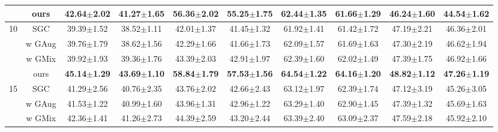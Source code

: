 \begin{table*}[ht]
{\begin{tabular}{@{}c|c|cccccccc@{}}
                      & ours                   & \textbf{42.64$\pm$2.02}          & \textbf{41.27$\pm$1.65}         & \textbf{56.36$\pm$2.02}          & \textbf{55.25$\pm$1.75}         & \textbf{62.44$\pm$1.35}         & \textbf{61.66$\pm$1.29}         & \textbf{46.24$\pm$1.60}         & \textbf{44.54$\pm$1.62}         \\ \midrule
\multirow{4}{*}{10}   & SGC                    & 39.39$\pm$1.52                   & 38.52$\pm$1.11                  & 42.01$\pm$1.37                   & 41.45$\pm$1.32                  & 61.92$\pm$1.41                  & 61.42$\pm$1.72                  & 47.19$\pm$2.21                  & 46.36$\pm$2.01                  \\
                      & w GAug                 & 39.76$\pm$1.79                   & 38.62$\pm$1.56                  & 42.29$\pm$1.66                   & 41.66$\pm$1.73                  & 62.09$\pm$1.57                  & 61.69$\pm$1.63                  & 47.30$\pm$2.19                  & 46.62$\pm$1.94                  \\
                      & w GMix                 & 39.92$\pm$1.93                   & 39.36$\pm$1.76                  & 43.39$\pm$2.03                   & 42.91$\pm$1.97                  & 62.39$\pm$1.60                  & 62.02$\pm$1.49                  & 47.39$\pm$1.75                  & 46.92$\pm$1.66                  \\
                      & ours                   & \textbf{45.14$\pm$1.29}          & \textbf{43.69$\pm$1.10}         & \textbf{58.84$\pm$1.79}          & \textbf{57.53$\pm$1.56}         & \textbf{64.54$\pm$1.22}         & \textbf{64.16$\pm$1.20}         & \textbf{48.82$\pm$1.12}         & \textbf{47.26$\pm$1.19}         \\ \midrule
\multirow{4}{*}{15}   & SGC                    & 41.29$\pm$2.56                   & 40.76$\pm$2.35                  & 43.76$\pm$2.02                   & 42.66$\pm$2.43                  & 63.12$\pm$1.97                  & 62.39$\pm$1.74                  & 47.12$\pm$3.19                  & 45.26$\pm$3.05                  \\
                      & w GAug                 & 41.53$\pm$1.22                   & 40.99$\pm$1.60                  & 43.96$\pm$1.31                   & 42.96$\pm$1.22                  & 63.29$\pm$1.40                  & 62.90$\pm$1.45                  & 47.39$\pm$1.32                  & 45.69$\pm$1.63                  \\
                      & w GMix                 & 42.36$\pm$1.41                   & 41.26$\pm$2.73                  & 44.39$\pm$2.59                   & 43.20$\pm$2.44                  & 63.39$\pm$2.40                  & 63.09$\pm$2.37                  & 47.59$\pm$2.18                  & 45.92$\pm$2.10                  \\

\end{tabular}}
\end{table*}
